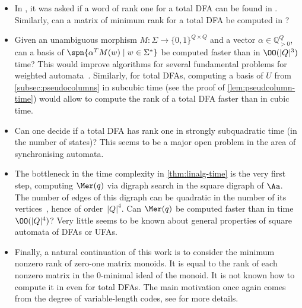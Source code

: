 \begin{itemize}
    \item In \cite{Eppstein1990}, it was asked if a word of rank one for a total DFA can be found in \NC. Similarly, can a matrix of minimum rank for a total DFA be computed in \NC?

    \item Given an unambiguous morphism $M \colon \Sigma \to \{0, 1\}^{Q \times Q}$ and a vector $\alpha \in \mathbb{Q}_{>0}^Q$, can a basis of  $\spn{\alpha^T M(w) \mid w \in \Sigma^*}$ be computed faster than in $\OO(|Q|^3)$ time? This would improve algorithms for several fundamental problems for weighted automata~\cite{KieferWeighted20}. Similarly, for total DFAs, computing a basis of $U$ from \autoref{subsec:pseudocolumns} in subcubic time (see the proof of \autoref{lem:pseudcolumn-time}) would allow to compute the rank of a total DFA faster than in cubic time.

    \item Can one decide if a total DFA has rank one in strongly subquadratic time (in the number of states)? This seems to be a major open problem in the area of synchronising automata.
    
    \item The bottleneck in the time complexity in \autoref{thm:linalg-time} is the very first step, computing $\Mer(q)$ via digraph search in the square digraph of $\Aa$. The number of edges of this digraph can be quadratic in the number of its vertices~\cite[Appendix A]{Kiefer2019Arxiv}, hence of order~$|Q|^4$. Can $\Mer(q)$ be computed faster than in time $\OO(|Q|^4)$? Very little seems to be known about general properties of square automata of DFAs or UFAs.

    \item Finally, a natural continuation of this work is to consider the minimum nonzero rank of zero-one matrix monoids. It is equal to the rank of each nonzero matrix in the 0-minimal ideal of the monoid. It is not known how to compute it in \NC even for total DFAs. The main motivation once again comes from the degree of variable-length codes, see \cite[Chapter 9]{Berstel2010} for more details. 
\end{itemize}

